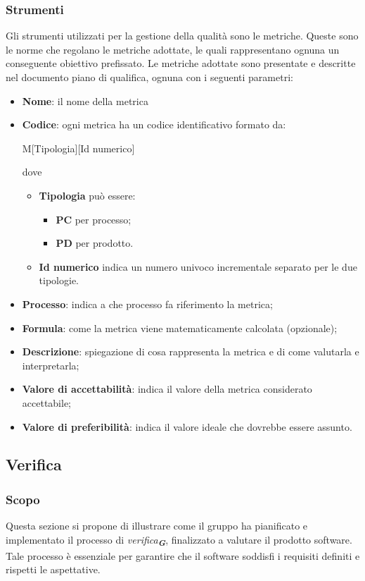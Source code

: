 \subsubsection{Strumenti}
Gli strumenti utilizzati per la gestione della qualità sono le metriche.
Queste sono le norme che regolano le metriche adottate, le quali rappresentano ognuna un conseguente obiettivo prefissato.
Le metriche adottate sono presentate e descritte nel documento piano di qualifica, ognuna con i seguenti parametri:
\begin{itemize}
    \item \textbf{Nome}: il nome della metrica
    \item \textbf{Codice}: ogni metrica ha un codice identificativo formato da:
    \begin{center}
        M[Tipologia][Id numerico]
    \end{center}
    dove
    \begin{itemize}
        \item \textbf{Tipologia} può essere:
        \begin{itemize}
            \item \textbf{PC} per processo;
            \item \textbf{PD} per prodotto.
        \end{itemize}
        \item \textbf{Id numerico} indica un numero univoco incrementale separato per le due tipologie.
    \end{itemize}
    \item \textbf{Processo}: indica a che processo fa riferimento la metrica;
    \item \textbf{Formula}: come la metrica viene matematicamente calcolata (opzionale);
    \item \textbf{Descrizione}: spiegazione di cosa rappresenta la metrica e di come valutarla e interpretarla;
    \item \textbf{Valore di accettabilità}: indica il valore della metrica considerato accettabile;
    \item \textbf{Valore di preferibilità}: indica il valore ideale che dovrebbe essere assunto.
\end{itemize}


\subsection{Verifica}
\label{sec:verifica}

\subsubsection{Scopo}
Questa sezione si propone di illustrare come il gruppo ha pianificato e implementato il processo di \emph{verifica}\textsubscript{\textit{\textbf{G}}}, finalizzato a valutare il prodotto software. Tale processo è essenziale per garantire che il software soddisfi i requisiti definiti e rispetti le aspettative. 

